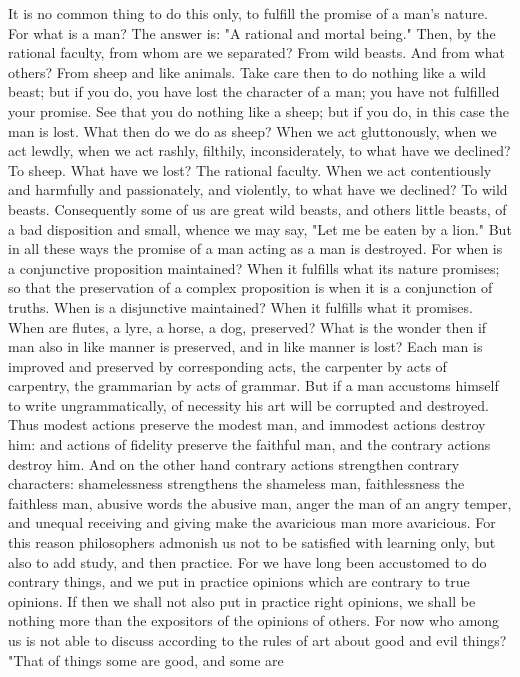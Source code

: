 \documentclass[a4paper]{article}
\begin{document}
    It is no common thing to do this only, to fulfill the promise of a man's
nature. For what is a man? The answer is: "A rational and mortal being." Then,
by the rational faculty, from whom are we separated? From wild beasts. And from
what others? From sheep and like animals. Take care then to do nothing like a
wild beast; but if you do, you have lost the character of a man; you have not
fulfilled your promise. See that you do nothing like a sheep; but if you do, in
this case the man is lost. What then do we do as sheep? When we act
gluttonously, when we act lewdly, when we act rashly, filthily,
inconsiderately, to what have we declined? To sheep. What have we lost? The
rational faculty. When we act contentiously and harmfully and passionately, and
violently, to what have we declined? To wild beasts. Consequently some of us
are great wild beasts, and others little beasts, of a bad disposition and
small, whence we may say, "Let me be eaten by a lion." But in all these ways
the promise of a man acting as a man is destroyed. For when is a conjunctive
proposition maintained? When it fulfills what its nature promises; so that the
preservation of a complex proposition is when it is a conjunction of truths.
When is a disjunctive maintained? When it fulfills what it promises. When are
flutes, a lyre, a horse, a dog, preserved? What is the wonder then if man also
in like manner is preserved, and in like manner is lost? Each man is improved
and preserved by corresponding acts, the carpenter by acts of carpentry, the
grammarian by acts of grammar. But if a man accustoms himself to write
ungrammatically, of necessity his art will be corrupted and destroyed. Thus
modest actions preserve the modest man, and immodest actions destroy him: and
actions of fidelity preserve the faithful man, and the contrary actions destroy
him. And on the other hand contrary actions strengthen contrary characters:
shamelessness strengthens the shameless man, faithlessness the faithless man,
abusive words the abusive man, anger the man of an angry temper, and unequal
receiving and giving make the avaricious man more avaricious.
    For this reason philosophers admonish us not to be satisfied with learning
only, but also to add study, and then practice. For we have long been
accustomed to do contrary things, and we put in practice opinions which are
contrary to true opinions. If then we shall not also put in practice right
opinions, we shall be nothing more than the expositors of the opinions of
others. For now who among us is not able to discuss according to the rules of
art about good and evil things? "That of things some are good, and some are
\end{document}
